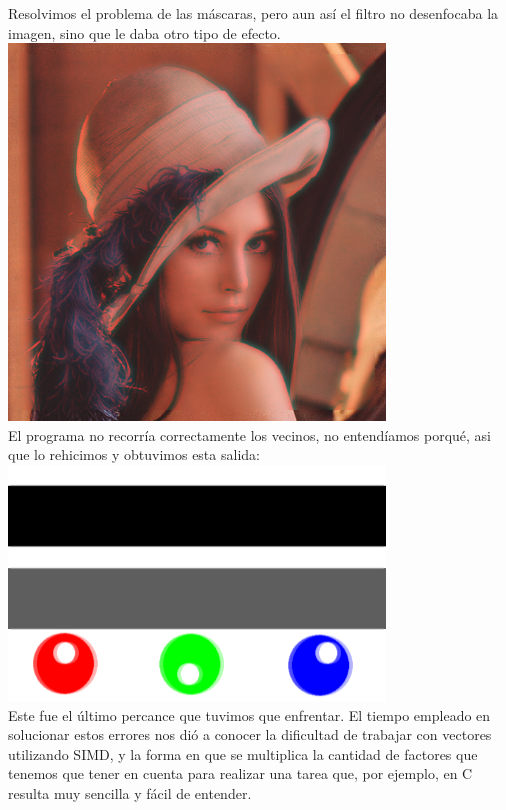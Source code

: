 \documentclass[10pt,a4paper,spanish]{article}
\begin{document}
Resolvimos el problema de las máscaras, pero aun así el filtro no desenfocaba la imagen, sino que le daba otro tipo de efecto. \\

\includegraphics[width=10cm, keepaspectratio]{problema_lena.png} \\

El programa no recorría correctamente los vecinos, no entendíamos porqué, asi que lo rehicimos y obtuvimos esta salida: \\

\includegraphics[width=10cm, keepaspectratio]{problema_circulos.png} \\

Este fue el último percance que tuvimos que enfrentar. El tiempo empleado en solucionar estos errores nos dió a conocer la dificultad de trabajar con vectores utilizando SIMD, y la forma en que se multiplica la cantidad de factores que tenemos que tener en cuenta para realizar una tarea que, por ejemplo, en C resulta muy sencilla y fácil de entender. \\
\end{document}
